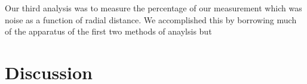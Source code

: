 \documentclass[12pt]{article} %
\begin{document}
Our third analysis was to measure the percentage of our measurement which was noise as a function of radial distance. We accomplished this by borrowing much of the apparatus of the first two methods of anaylsis but 

\section{Discussion}
\end{document}
